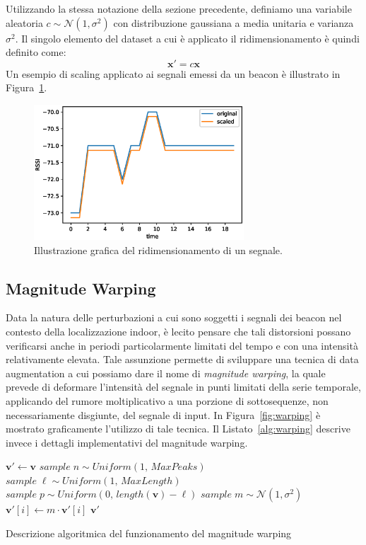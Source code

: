 Utilizzando la stessa notazione della sezione precedente, definiamo una
variabile aleatoria \(c \sim \mathcal{N}(1, \sigma^2)\) con distribuzione
gaussiana a media unitaria e varianza \(\sigma^2\). Il singolo elemento del
dataset a cui è applicato il ridimensionamento è quindi definito come:
\[ \bm x' = c \bm x \] 
Un esempio di scaling applicato ai segnali emessi da un beacon è illustrato in
Figura~\ref{fig:scaling}.
\begin{figure}[!htp]
  \centering\includegraphics[width=0.7\textwidth]{./img/scaling.eps}
  \caption{Illustrazione grafica del ridimensionamento di un segnale.}%
  \label{fig:scaling}%
\end{figure}

\subsection{Magnitude Warping}\label{subsec:warping}
Data la natura delle perturbazioni a cui sono soggetti i segnali dei beacon nel
contesto della localizzazione indoor, è lecito pensare che tali distorsioni
possano verificarsi anche in periodi particolarmente limitati del tempo e con
una intensità relativamente elevata. Tale assunzione permette di sviluppare una
tecnica di data augmentation a cui possiamo dare il nome di \emph{magnitude
  warping}, la quale prevede di deformare l'intensità del segnale in punti
limitati della serie temporale, applicando del rumore moltiplicativo a una
porzione di sottosequenze, non necessariamente disgiunte, del segnale di input.
In Figura~\ref{fig:warping} è mostrato graficamente l'utilizzo di tale tecnica.
Il Listato~\ref{alg:warping} descrive invece i dettagli implementativi del
magnitude warping.
\begin{algorithm}%
  \begin{algorithmic}
      \State $\bm v' \gets \bm v$
      \State $sample\; n \sim \mathit{Uniform}(1,\, \mathit{MaxPeaks})$
        \State $sample\; \ell \sim \mathit{Uniform}(1,\, \mathit{MaxLength})$
        \State $sample\; p \sim \mathit{Uniform}(0,\, length(\bm v) - \ell)$
        \State $sample\; m \sim \mathcal{N}(1, \sigma^2)$
        \State $\bm v'[i] \gets m \cdot \bm v'[i]$
        \EndFor
      \EndFor
      \Return $\bm v'$
    \EndFunction
  \end{algorithmic}
  \caption{Descrizione algoritmica del funzionamento del magnitude warping}
  \label{alg:warping}
\end{algorithm}

